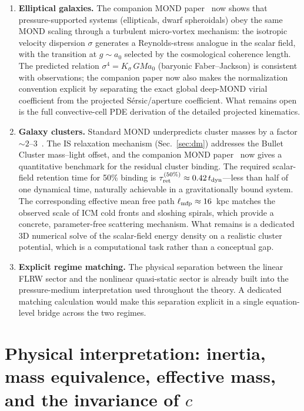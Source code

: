 \documentclass[aps,prd,onecolumn,superscriptaddress,nofootinbib,showpacs,12pt]{revtex4-2}
\begin{document}
\begin{enumerate}
\item \textbf{Elliptical galaxies.}  The companion MOND
  paper~\cite{Lotishvili2026MOND} now shows that
  pressure-supported systems (ellipticals, dwarf
  spheroidals) obey the same MOND scaling through a
  turbulent micro-vortex mechanism: the isotropic
  velocity dispersion $\sigma$ generates a Reynolds-stress
  analogue in the scalar field, with the transition at
  $g\sim a_0$ selected by the cosmological coherence length.
  The predicted relation $\sigma^4 = K_\sigma\,GMa_0$
  (baryonic Faber--Jackson) is consistent with observations;
  the companion paper now also makes the normalization
  convention explicit by separating the exact global
  deep-MOND virial coefficient from the projected
  S\'ersic/aperture coefficient.  What remains open is the
  full convective-cell PDE derivation of the detailed
  projected kinematics.

\item \textbf{Galaxy clusters.}  Standard MOND
  underpredicts cluster masses by a factor
  ${\sim}2$--$3$~\cite{Angus2008}.  The IS relaxation
  mechanism (Sec.~\ref{sec:dm}) addresses the Bullet
  Cluster mass--light offset, and the companion MOND
  paper~\cite{Lotishvili2026MOND} now gives a
  quantitative benchmark for the residual cluster
  binding.  The required scalar-field retention time for
  50\% binding is $\tau_{\rm ret}^{(50\%)}\approx
  0.42\,t_{\rm dyn}$---less than half of one dynamical
  time, naturally achievable in a gravitationally bound
  system.  The corresponding effective mean free path
  $\ell_{\rm mfp}\approx 16$~kpc matches the observed
  scale of ICM cold fronts and sloshing spirals, which
  provide a concrete, parameter-free scattering mechanism.
  What remains is a dedicated 3D numerical solve of
  the scalar-field energy density on a realistic cluster
  potential, which is a computational task rather than a
  conceptual gap.

\item \textbf{Explicit regime matching.}  The physical
  separation between the linear FLRW sector and the
  nonlinear quasi-static sector is already built into the
  pressure-medium interpretation used throughout the
  theory.  A dedicated matching calculation would make
  this separation explicit in a single equation-level
  bridge across the two regimes.
\end{enumerate}

\section{Physical interpretation: inertia, mass equivalence,
  effective mass, and the invariance of $c$}\label{sec:interpretation}
\end{document}

